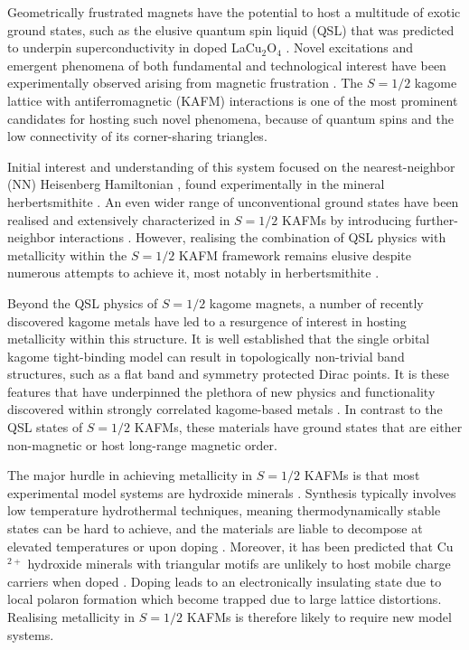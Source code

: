 \documentclass[
sn-nature,
Numbered,
iicol]
{sn-jnl}%
\begin{document}
Geometrically frustrated magnets have the potential to host a multitude of exotic ground states, such as the elusive quantum spin liquid (QSL) that was predicted to underpin superconductivity in doped LaCu$_{2}$O$_{4}$ \cite{Anderson1987,Balents2010,Savary2017}.
Novel excitations and emergent phenomena of both fundamental and technological interest have been experimentally observed arising from magnetic frustration
\cite{Banerjee2017,Fak2017,Klanjsek2017,Paddison2017}. 
The $S=1/2$ kagome lattice with antiferromagnetic (KAFM) interactions is one of the most prominent candidates for hosting such novel phenomena, because of quantum spins and the low connectivity of its corner-sharing triangles.

Initial interest and understanding of this system focused on the nearest-neighbor (NN) Heisenberg Hamiltonian \cite{Chalker1992GroundStateDisorder,Harris1992,Singh1992,Zeng1990}, found experimentally in the mineral herbertsmithite \cite{Han2012,Norman2016}. 
An even wider range of unconventional ground states have been realised and extensively characterized in $S=1/2$ KAFMs by introducing further-neighbor interactions \cite{Messio2011,Bieri2016,Waldtmann1998,Domenge2008,Fak2012,Boldrin2018,Chalker1992,Lecheminant1997,Domenge2005}. 
However, realising the combination of QSL physics with metallicity within the $S = 1/2$ KAFM framework remains elusive despite numerous attempts to achieve it, most notably in herbertsmithite \cite{Kelly2016,Liu2018c,Gupta2019}.

Beyond the QSL physics of $S = 1/2$ kagome magnets, a number of recently discovered kagome metals have led to a resurgence of interest in hosting metallicity within this structure. It is well established that the single orbital kagome tight-binding model can result in topologically non-trivial band structures, such as a flat band and symmetry protected Dirac points. 
It is these features that have underpinned the plethora of new physics and functionality discovered within strongly correlated kagome-based metals \cite{Ye2018,Chen2021,Teng2022,Yin2019,Ortiz2020}.
In contrast to the QSL states of $S = 1/2$ KAFMs, these materials have ground states that are either non-magnetic or host long-range magnetic order. 

The major hurdle in achieving metallicity in $S = 1/2$ KAFMs is that most experimental model systems are hydroxide minerals \cite{Han2012,Han2014,Feng2018,Fak2012,Boldrin2018,Georgopoulou23}. 
Synthesis typically involves low temperature hydrothermal techniques, meaning thermodynamically stable states can be hard to achieve, and the materials are liable to decompose at elevated temperatures or upon doping \cite{Kelly2016}. 
Moreover, it has been predicted that Cu$^{2+}$ hydroxide minerals with triangular motifs are unlikely to host mobile charge carriers when doped \cite{Liu2018c}. 
Doping leads to an electronically insulating state due to local polaron formation which become trapped due to large lattice distortions. 
Realising metallicity in $S = 1/2$ KAFMs is therefore likely to require new model systems.
\end{document}
